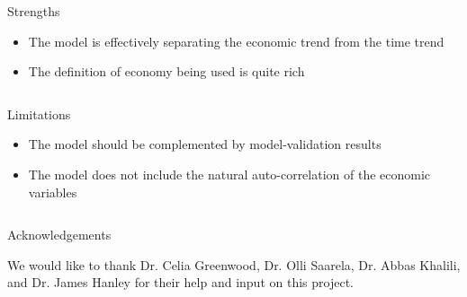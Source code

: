 \documentclass[final]{beamer}
\newcounter{acolumn}%
\def\autoheight{\vspace*{0pt}}%
\begin{document}
\begin{frame}
\begin{acolumns}[t]
        \begin{column}{.32\linewidth}
		
         
         \begin{block}{Strengths}
         	\begin{itemize}
         		\item The model is effectively separating the economic trend from the time trend
         		\item The definition of economy being used is quite rich
         		
         	\end{itemize}
          \autoheight   
         \end{block}
                      
        \end{column}
                  
        
        \begin{column}{.32\linewidth}
         
         \begin{block}{Limitations}
         	\begin{itemize}
         		\item The model should be complemented by model-validation results
         		\item The model does not include the natural auto-correlation of the economic variables
         	\end{itemize}
          \autoheight   
         \end{block}
                      
        \end{column}
        
        
         \begin{column}{.32\linewidth}
                 
          \begin{block}{Acknowledgements}
             \begin{center}
             We would like to thank Dr. Celia Greenwood, Dr. Olli Saarela, Dr. Abbas Khalili, and Dr. James Hanley for their help and input on this project.
             \end{center}
             
           \autoheight   
          \end{block}
                              
         \end{column}
        
        
        \end{acolumns}
    
    \vfill 
  \end{frame}
\end{document}
